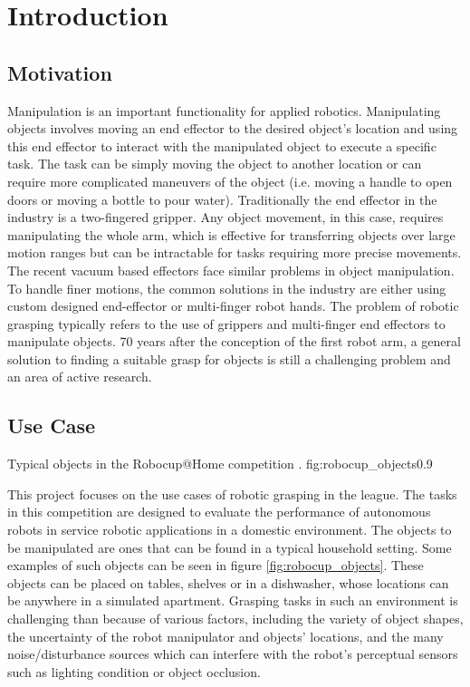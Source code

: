 
\chapter{Introduction}


\section{Motivation}

Manipulation is an important functionality for applied robotics. Manipulating objects involves moving an end effector
to the desired object's location and using this end effector to interact with the manipulated object to execute a
specific task. The task can be simply moving the object to another location or can require more complicated maneuvers
of the object (i.e. moving a handle to open doors or moving a bottle to pour water). Traditionally the end effector in
the industry is a two-fingered gripper. Any object movement, in this case, requires manipulating the whole arm, which is
effective for transferring objects over large motion ranges but can be intractable for tasks requiring more precise
movements. The recent vacuum based effectors face similar problems in object manipulation. To handle finer motions, the
common solutions in the industry are either using custom designed end-effector or multi-finger robot hands. The problem
of robotic grasping typically refers to the use of grippers and multi-finger end effectors to manipulate objects. 70
years after the conception of the first robot arm, a general solution to finding a suitable grasp for objects is still a
challenging problem and an area of active research.


\section{Use Case}

             {Typical objects in the Robocup@Home competition \cite{robocupRulebook2018}.}
             {fig:robocup_objects}{0.9\textwidth}

This project focuses on the use cases of robotic grasping in the
 league. The tasks in this competition are designed to
evaluate the performance of autonomous robots in service robotic applications in a domestic environment. The objects to
be manipulated are ones that can be found in a typical household setting. Some examples of such objects can be seen in
figure \ref{fig:robocup_objects}. These objects can be placed on tables, shelves or in a dishwasher, whose locations
can be anywhere in a simulated apartment. Grasping tasks in such an environment is challenging than because of various
factors, including the variety of object shapes, the uncertainty of the robot manipulator and objects' locations,
and the many noise/disturbance sources which can interfere with the robot's perceptual sensors such as lighting
condition or object occlusion.

